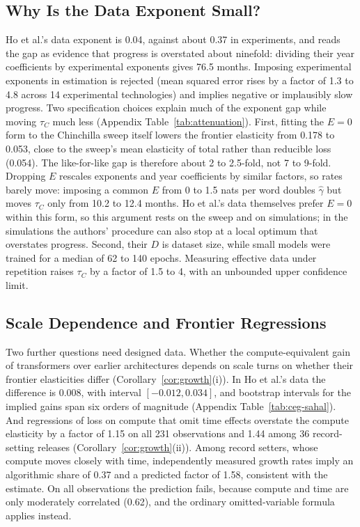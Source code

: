 \documentclass[AER,finalmode]{AEA}
\theoremstyle{definition}
\theoremstyle{remark}
\begin{document}
\subsection{Why Is the Data Exponent Small?}

Ho et al.'s data exponent is 0.04, against about 0.37 in experiments, and \citet{whitfill2025note} reads the gap as
evidence that progress is overstated about ninefold: dividing their year coefficients by experimental exponents gives
76.5 months. Imposing experimental exponents in estimation is rejected (mean squared error rises by a factor of 1.3 to
4.8 across 14 experimental technologies) and implies negative or implausibly slow progress. Two specification choices
explain much of the exponent gap while moving $\tau_C$ much less (Appendix Table~\ref{tab:attenuation}). First, fitting
the $E=0$ form to the Chinchilla sweep itself lowers the frontier elasticity from 0.178 to 0.053, close to the sweep's
mean elasticity of total rather than reducible loss (0.054). The like-for-like gap is therefore about 2 to 2.5-fold,
not 7 to 9-fold. Dropping $E$ rescales exponents and year coefficients by similar factors, so rates barely move:
imposing a common $E$ from 0 to 1.5 nats per word doubles $\hat\gamma$ but moves $\tau_C$ only from 10.2 to 12.4
months. Ho et al.'s data themselves prefer $E=0$ within this form, so this argument rests on the sweep and on
simulations; in the simulations the authors' procedure can also stop at a local optimum that overstates progress.
Second, their $D$ is dataset size, while small models were trained for a median of 62 to 140 epochs. Measuring
effective data under repetition \citep{muennighoff2023scaling} raises $\tau_C$ by a factor of 1.5 to 4, with an
unbounded upper confidence limit.

\subsection{Scale Dependence and Frontier Regressions}

Two further questions need designed data. Whether the compute-equivalent gain of transformers over earlier
architectures depends on scale turns on whether their frontier elasticities differ (Corollary~\ref{cor:growth}(i)). In
Ho et al.'s data the difference is 0.008, with interval $[-0.012,0.034]$, and bootstrap intervals for the implied gains
span six orders of magnitude (Appendix Table~\ref{tab:ceg-sahal}). And regressions of loss on compute that omit time
effects overstate the compute elasticity by a factor of 1.15 on all 231 observations and 1.44 among 36 record-setting
releases (Corollary~\ref{cor:growth}(ii)). Among record setters, whose compute moves closely with time, independently
measured growth rates imply an algorithmic share of 0.37 and a predicted factor of 1.58, consistent with the estimate.
On all observations the prediction fails, because compute and time are only moderately correlated (0.62), and the
ordinary omitted-variable formula applies instead.
\end{document}
